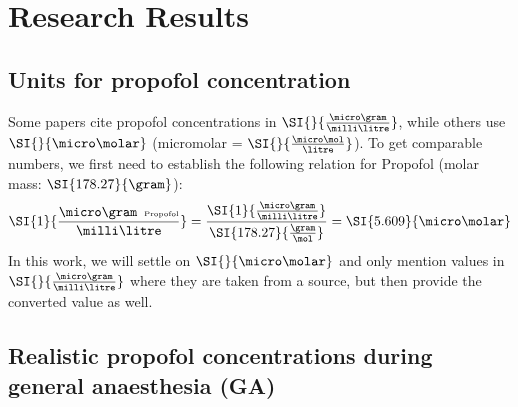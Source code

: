 %
%
%
%
%

\section{Research Results}

\subsection{Units for propofol concentration}
Some papers cite propofol concentrations in $\SI{}{\frac{\micro\gram}{\milli\litre}}$,
while others use $\SI{}{\micro\molar}$ (micromolar = $\SI{}{\frac{\micro\mol}{\litre}}$).
To get comparable numbers, we first need to establish the following relation for Propofol (molar mass: $\SI{178
.27}{\gram}$):
\[ \SI{1}{\frac{\micro\gram\hspace{0.5em}\text{\tiny{Propofol}}}{\milli\litre}}  =
\frac{ \SI{1}{\frac{\micro\gram}{\milli\litre}}}{\SI{178.27}{\frac{\gram}{\mol}}} = \SI{5.609}{\micro\molar} \]
In this work, we will settle on $\SI{}{\micro\molar}$
and only mention values in $\SI{}{\frac{\micro\gram}{\milli\litre}}$ where they are taken from a source,
but then provide the converted value as well.


\subsection{Realistic propofol concentrations during general anaesthesia (GA)}\label{subsec:realistic-prop-conc-during-ga}

